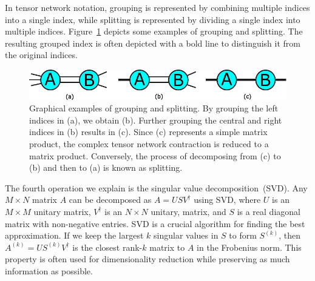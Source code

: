 \documentclass[12pt,dvipdfmx,twoside,openright]{report}
\begin{document}
In tensor network notation, grouping is represented by combining multiple indices into a single index, while splitting is represented by dividing a single index into multiple indices.
Figure~\ref{fig:grouping-splitting} depicts some examples of grouping and splitting.
The resulting grouped index is often depicted with a bold line to distinguish it from the original indices.

\begin{figure}
    \centering
    \includegraphics[width=\linewidth]{grouping-splitting.pdf}
    \caption{Graphical examples of grouping and splitting.
    By grouping the left indices in (a), we obtain (b). 
    Further grouping the central and right indices in (b) results in (c). 
    Since (c) represents a simple matrix product, the complex tensor network contraction is reduced to a matrix product. 
    Conversely, the process of decomposing from (c) to (b) and then to (a) is known as splitting.}
    \label{fig:grouping-splitting}
\end{figure}

The fourth operation we explain is the singular value decomposition~(SVD).
Any $M\times N$ matrix $A$ can be decomposed as $A=USV^\dagger$ using SVD, where $U$ is an $M\times M$ unitary matrix, $V^\dagger$ is an $N\times N $ unitary, matrix, and $S$ is a real diagonal matrix with non-negative entries.
SVD is a crucial algorithm for finding the best approximation.
If we keep the largest $k$ singular values in $S$ to form $S^{(k)}$, then $A^{(k)}=US^{(k)}V^\dagger$ is the closest rank-$k$ matrix to $A$ in the Frobenius norm.
This property is often used for dimensionality reduction while preserving as much information as possible.
\end{document}
